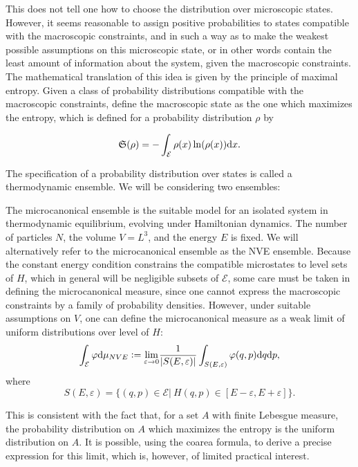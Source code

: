 This does not tell one how to choose the distribution over microscopic states. However, it seems reasonable to assign positive probabilities to states compatible with the macroscopic constraints, and in such a way as to make the weakest possible assumptions on this microscopic state, or in other words contain the least amount of information about the system, given the macroscopic constraints. The mathematical translation of this idea is given by the principle of maximal entropy. Given a class of probability distributions compatible with the macroscopic constraints, define the macroscopic state as the one which maximizes the entropy, which is defined for a probability distribution $\rho$ by

\begin{equation}
    \label{entropy}
    \mathfrak S(\rho)=-\int_{\mathcal E} \rho(x)\ln(\rho(x))\text{d}x.
\end{equation}

The specification of a probability distribution over states is called a thermodynamic ensemble. We will be considering two ensembles:

\begin{example}

    The microcanonical ensemble is the suitable model for an isolated system in thermodynamic equilibrium, evolving under Hamiltonian dynamics. The number of particles $N$, the volume $V=L^3$, and the energy $E$ is fixed. We will alternatively refer to the microcanonical ensemble as the NVE ensemble.
     Because the constant energy condition constrains the compatible microstates to level sets of $H$, which in general will be negligible subsets of $\mathcal E$, some care must be taken in defining the microcanonical measure, since one cannot express the macroscopic constraints by a family of probability densities.
      However, under suitable assumptions on $V$, one can define the microcanonical measure as a weak limit of uniform distributions over level  of $H$:
    $$\int_\mathcal{E} \varphi \text d\mu_{NVE} \mathrel{\mathop:}= \underset{\varepsilon \to 0}{\mathrm{lim}} \frac{1}{|S(E,\varepsilon)|}\int_{S(E,\varepsilon)} \varphi(q,p) \text d q \text d p,$$
    where 
    $$S(E,\varepsilon) = \{ (q,p) \in \mathcal E |\ H(q,p) \in [E-\varepsilon,E+\varepsilon]\}.$$
    
    This is consistent with the fact that, for a set $A$ with finite Lebesgue measure, the probability distribution on $A$ which maximizes the entropy is the uniform distribution on $A$. 
    It is possible, using the coarea formula, to derive a precise expression for this limit, which is, however, of limited practical interest.
    
\end{example}


